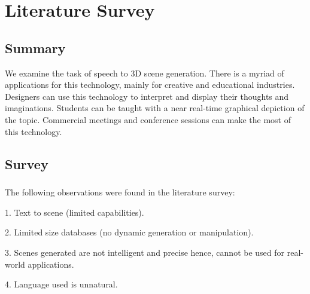 \chapter{Literature Survey}
\section{Summary}
We examine the task of speech to 3D scene generation. There is a myriad of
applications for this technology, mainly for creative and educational industries. Designers can use this technology to interpret and display
their thoughts and imaginations. Students can be taught with a near real-time graphical depiction of the topic. Commercial meetings and conference sessions can make the most of this technology.
\section{Survey}
\paragraph{}The following observations were found in the literature survey:
	\begin{description}
		\item{1.} Text to scene (limited capabilities).
		\item{2.} Limited size databases (no dynamic generation or manipulation).
		\item{3.} Scenes generated are not intelligent and precise hence, cannot be used for real-world applications.
		\item{4.} Language used is unnatural.
	\end{description}
